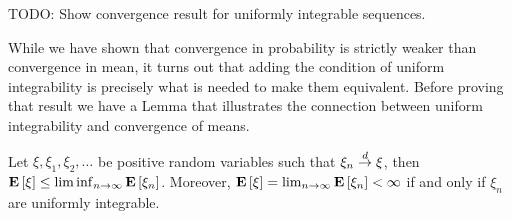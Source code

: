  TODO: Show convergence result for uniformly integrable sequences.

While we have shown that convergence in probability is strictly weaker
than convergence in mean, it turns out that adding the condition of
uniform integrability is precisely what is needed to make them
equivalent.  Before proving that result we have a Lemma that
illustrates the connection between uniform integrability and
convergence of means.
\begin{lem}\label{UniformIntegrableAndMeans}Let $\xi, \xi_1, \xi_2, \dotsc$ be positive random variables such
  that $\xi_n \overset{d}\to \xi$, then $\textbf{E}\left[\xi\right] \leq \liminf_{n \to
    \infty} \textbf{E}\left[\xi_n\right]$.  Moreover, $\textbf{E}\left[\xi\right] = \lim_{n \to
    \infty} \textbf{E}\left[\xi_n\right] < \infty$ if and only if $\xi_n$ are uniformly integrable.
\end{lem}
